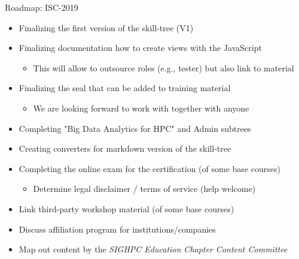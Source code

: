 \documentclass[compress,aspectratio=169]{beamer}
\begin{document}
\begin{frame}{Roadmap: ISC-2019}
		\begin{itemize}
			\item Finalizing the first version of the skill-tree (V1)
			\item Finalizing documentation how to create views with the JavaScript
        \begin{itemize}
          \item This will allow to outsource roles (e.g., tester) but also link to material
        \end{itemize}
			\item Finalizing the seal that can be added to training material
			\begin{itemize}
				\item We are looking forward to work with together with anyone
			\end{itemize}
			\item Completing "Big Data Analytics for HPC" and Admin subtrees
      \item Creating converters for markdown version of the skill-tree
			\item Completing the online exam for the certification (of some base courses)
				\begin{itemize}
					\item Determine legal disclaimer / terms of service (help welcome)
				\end{itemize}
      \item Link third-party workshop material (of some base courses)
			\item Discuss affiliation program for institutions/companies
			\item Map out content by the \textit{SIGHPC Education Chapter Content Committee}
		\end{itemize}
  \label{frame:last}
\end{frame}
\end{document}

